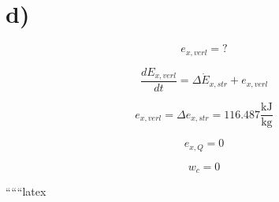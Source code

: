 

\section*{d)}

\[
e_{x,verl} = ?
\]


\[
\frac{dE_{x,verl}}{dt} = \Delta \dot{E}_{x,str} + e_{x,verl}
\]

\[
e_{x,verl} = \Delta e_{x,str} = 116.487 \frac{\text{kJ}}{\text{kg}}
\]

\[
e_{x,Q} = 0
\]

\[
w_{c} = 0
\]

``````latex